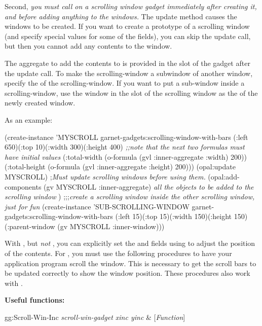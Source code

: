 Second, {\it you must call  on a scrolling window gadget
immediately after creating it, and before adding anything to the
windows.} The update method causes the windows to be created.  If you
want to create a prototype of a scrolling window (and specify special
values for some of the fields), you can skip the update call, but then
you cannot add any contents to the window.

The aggregate to add the contents to is provided in the slot
 of the gadget after the update call.  To make
the scrolling-window a subwindow of another window, specify the
 of the scrolling-window.  If you want to put a
sub-window inside a scrolling-window, use the window in the
 slot of the scrolling window as the  of
the newly created window.

As an example:
\begin{programexample}
(create-instance 'MYSCROLL garnet-gadgets:scrolling-window-with-bars
   (:left 650)(:top 10)(:width 300)(:height 400)
   {\it ;;note that the next two formulas must have initial values}
   (:total-width (o-formula (gvl :inner-aggregate :width) 200))
   (:total-height (o-formula (gvl :inner-aggregate :height) 200)))
(opal:update MYSCROLL) ;{\it Must update scrolling windows before using them.}
(opal:add-components (gv MYSCROLL :inner-aggregate)
	    {\it all the objects to be added to the scrolling window}
	    )
;;;{\it create a scrolling window inside the other scrolling window, just for fun}
(create-instance 'SUB-SCROLLING-WINDOW garnet-gadgets:scrolling-window-with-bars
   (:left 15)(:top 15)(:width 150)(:height 150)
   (:parent-window (gv MYSCROLL :inner-window)))
\end{programexample}

With , but {\it not} ,
you can explicitly set the  and
 fields using  to adjust the position of the
contents.  For , you must use the following
procedures to have your application program scroll the window.  This
is necessary to get the scroll bars to be updated correctly to show the
window position.  These procedures also work with .

{\bf Useful functions:}

\begin{programexample}
gg:Scroll-Win-Inc {\it scroll-win-gadget xinc yinc} & [{\it Function}]
\end{programexample}


